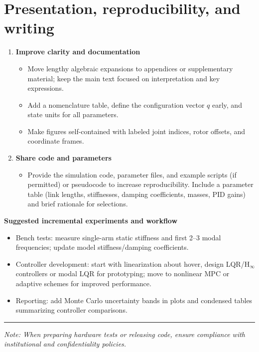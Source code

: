 \documentclass[11pt,letterpaper]{article}
\begin{document}
\section*{Presentation, reproducibility, and writing}
\begin{enumerate}[resume,left=0pt,label=\textbf{\arabic*.},wide=0pt]
  \item \textbf{Improve clarity and documentation}
    \begin{itemize}
      \item Move lengthy algebraic expansions to appendices or supplementary material; keep the main text focused on interpretation and key expressions.
      \item Add a nomenclature table, define the configuration vector $q$ early, and state units for all parameters.
      \item Make figures self-contained with labeled joint indices, rotor offsets, and coordinate frames.
    \end{itemize}

  \item \textbf{Share code and parameters}
    \begin{itemize}
      \item Provide the simulation code, parameter files, and example scripts (if permitted) or pseudocode to increase reproducibility. Include a parameter table (link lengths, stiffnesses, damping coefficients, masses, PID gains) and brief rationale for selections.
    \end{itemize}
\end{enumerate}

\bigskip
\noindent \textbf{Suggested incremental experiments and workflow}
\begin{itemize}
  \item Bench tests: measure single-arm static stiffness and first 2--3 modal frequencies; update model stiffness/damping coefficients.
  \item Controller development: start with linearization about hover, design LQR/H$_\infty$ controllers or modal LQR for prototyping; move to nonlinear MPC or adaptive schemes for improved performance.
  \item Reporting: add Monte Carlo uncertainty bands in plots and condensed tables summarizing controller comparisons.
\end{itemize}

\vfill
\hrule
\smallskip
\noindent \textit{Note: When preparing hardware tests or releasing code, ensure compliance with institutional and confidentiality policies.}
\end{document}
